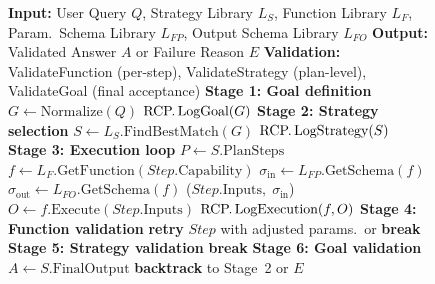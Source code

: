 \documentclass[largeformat]{interact}
\begin{document}
\begin{figure}[!htbp]
\begin{minipage}[c]{0.55\textwidth}
\begin{algorithm}[H]
\begin{algorithmic}[1]
            \State \textbf{Input:} User Query $Q$, Strategy Library $L_S$, Function Library $L_F$, Param.\ Schema Library $L_{FP}$, Output Schema Library $L_{FO}$
            \State \textbf{Output:} Validated Answer $A$ or Failure Reason $E$
            \State \textbf{Validation:} ValidateFunction (per-step), ValidateStrategy (plan-level), ValidateGoal (final acceptance)
            \State
            \State \textbf{Stage 1: Goal definition} \label{alg:stage1}
            \State $G \gets \text{Normalize}(Q)$ 
            \State $\text{RCP.\,LogGoal}(G)$
            \State
            \State \textbf{Stage 2: Strategy selection} \label{alg:stage2}
            \State $S \gets L_S.\text{FindBestMatch}(G)$ 
            \State $\text{RCP.\,LogStrategy}(S)$
            \State
            \State \textbf{Stage 3: Execution loop} \label{alg:stage3}
            \State $P \gets S.\text{PlanSteps}$
                \State $f \gets L_F.\text{GetFunction}(Step.\text{Capability})$
                \State $\sigma_{\text{in}} \gets L_{FP}.\text{GetSchema}(f)$ 
                \State $\sigma_{\text{out}} \gets L_{FO}.\text{GetSchema}(f)$ 
                \State {}($Step.\text{Inputs},\;\sigma_{\text{in}}$) 
                \State $O \gets f.\text{Execute}(Step.\text{Inputs})$
                \State $\text{RCP.\,LogExecution}(f, O)$
                \State \textbf{Stage 4: Function validation} \label{alg:stage4}
                 
                    \State \textbf{retry} $Step$ with adjusted params.\ or \textbf{break}
                \EndIf
                \State \textbf{Stage 5: Strategy validation} \label{alg:stage5}
                    \State \textbf{break} 
                \EndIf
            \EndFor
            \State
            \State \textbf{Stage 6: Goal validation} \label{alg:stage6}
                \State \Return $A \gets S.\text{FinalOutput}$
            \Else
                \State \textbf{backtrack} to Stage~2 or \Return $E$
            \EndIf
            \end{algorithmic}
        \end{algorithm}
    \end{minipage}
\end{figure}
\end{document}
